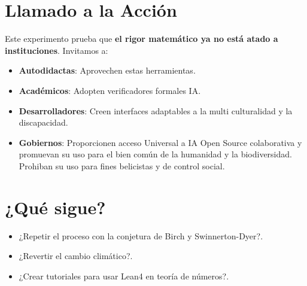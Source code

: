 \documentclass[12pt, a4paper]{article}
\begin{document}
\section{Llamado a la Acción}
Este experimento prueba que \textbf{el rigor matemático ya no está atado a instituciones}. Invitamos a:
\begin{itemize}
\item \textbf{Autodidactas}: Aprovechen estas herramientas.
\item \textbf{Académicos}: Adopten verificadores formales IA.
\item \textbf{Desarrolladores}: Creen interfaces adaptables a la multi culturalidad y la discapacidad.
\item \textbf{Gobiernos}: Proporcionen acceso Universal a IA Open Source colaborativa y promuevan su uso para el bien común de la humanidad y la biodiversidad. Prohiban su uso para fines belicistas y de control social.
\end{itemize}

\begin{center}
\end{center}

\section*{¿Qué sigue?}
\begin{itemize}
\item ¿Repetir el proceso con la conjetura de Birch y Swinnerton-Dyer?.
\item ¿Revertir el cambio climático?. 
\item ¿Crear tutoriales para usar Lean4 en teoría de números?.
\end{itemize}

\printbibliography
\end{document}
